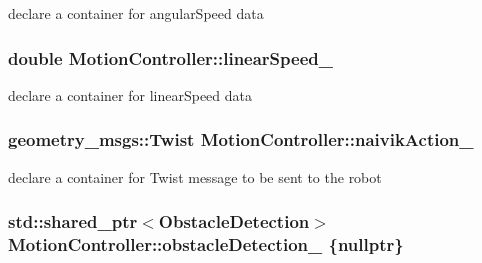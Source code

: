 declare a container for angular\+Speed data 

\subsubsection[{\texorpdfstring{linear\+Speed\+\_\+}{linearSpeed_}}]{\setlength{\rightskip}{0pt plus 5cm}double Motion\+Controller\+::linear\+Speed\+\_\+\hspace{0.3cm}{\ttfamily [private]}}\hypertarget{classMotionController_a58fde3691cec5842a4406da860390b80}{}\label{classMotionController_a58fde3691cec5842a4406da860390b80}


declare a container for linear\+Speed data 

\subsubsection[{\texorpdfstring{naivik\+Action\+\_\+}{naivikAction_}}]{\setlength{\rightskip}{0pt plus 5cm}geometry\+\_\+msgs\+::\+Twist Motion\+Controller\+::naivik\+Action\+\_\+\hspace{0.3cm}{\ttfamily [private]}}\hypertarget{classMotionController_a466cdca708caaab029acad5947b3b79c}{}\label{classMotionController_a466cdca708caaab029acad5947b3b79c}


declare a container for Twist message to be sent to the robot 

\subsubsection[{\texorpdfstring{obstacle\+Detection\+\_\+}{obstacleDetection_}}]{\setlength{\rightskip}{0pt plus 5cm}std\+::shared\+\_\+ptr$<${\bf Obstacle\+Detection}$>$ Motion\+Controller\+::obstacle\+Detection\+\_\+ \{nullptr\}\hspace{0.3cm}{\ttfamily [private]}}\hypertarget{classMotionController_a6c025f207fc59e04928b95404f49e396}{}\label{classMotionController_a6c025f207fc59e04928b95404f49e396}


